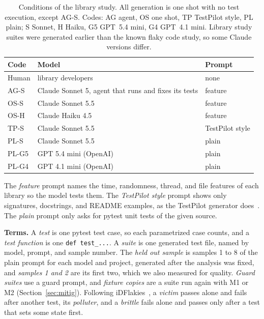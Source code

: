 \begin{table}[htbp]
\caption{Conditions of the library study. All generation is one shot with no test execution, except AG-S. Codes: AG agent, OS one shot, TP TestPilot style, PL plain; S Sonnet, H Haiku, G5 GPT~5.4 mini, G4 GPT~4.1 mini. Library study suites were generated earlier than the known flaky code study, so some Claude versions differ.}
\label{tab:conds}
\small
\begin{tabularx}{\columnwidth}{lXl}
\toprule
Code & Model & Prompt \\
\midrule
Human & library developers & none \\
AG-S & Claude Sonnet 5, agent that runs and fixes its tests & feature \\
OS-S & Claude Sonnet 5.5 & feature \\
OS-H & Claude Haiku 4.5 & feature \\
TP-S & Claude Sonnet 5.5 & TestPilot style \\
PL-S & Claude Sonnet 5.5 & plain \\
PL-G5 & GPT 5.4 mini (OpenAI) & plain \\
PL-G4 & GPT 4.1 mini (OpenAI) & plain \\
\bottomrule
\end{tabularx}
\end{table}
The \emph{feature} prompt names the time, randomness, thread, and file features of each library so the model tests them. The \emph{TestPilot style} prompt shows only signatures, docstrings, and README examples, as the TestPilot generator does~\cite{schafer2024}. The \emph{plain} prompt only asks for pytest unit tests of the given source.

\textbf{Terms.} A \emph{test} is one pytest test case, so each parametrized case counts, and a \emph{test function} is one \texttt{def test\_...}. A \emph{suite} is one generated test file, named by model, prompt, and sample number. The \emph{held out sample} is samples 1 to 8 of the plain prompt for each model and project, generated after the analysis was fixed, and \emph{samples 1 and 2} are its first two, which we also measured for quality. \emph{Guard suites} use a guard prompt, and \emph{fixture copies} are a suite run again with M1 or M2 (Section~\ref{sec:mitig}). Following iDFlakies~\cite{lam2019}, a \emph{victim} passes alone and fails after another test, its \emph{polluter}, and a \emph{brittle} fails alone and passes only after a test that sets some state first.

